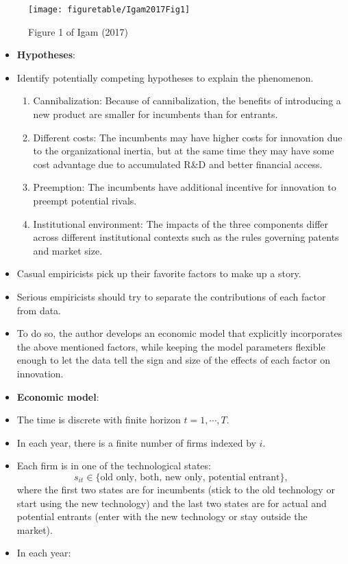 \documentclass[
]{book}
\providecommand{\tightlist}{%
  \setlength{\itemsep}{0pt}\setlength{\parskip}{0pt}}
\begin{document}
\begin{figure}

{\centering \texttt{[image: figuretable/Igam2017Fig1]} 

}

\caption{Figure 1 of Igam (2017)}\label{fig:unnamed-chunk-2}
\end{figure}

\begin{itemize}
\item
  \textbf{Hypotheses}:
\item
  Identify potentially competing hypotheses to explain the phenomenon.

  \begin{enumerate}
  \def\labelenumi{\arabic{enumi}.}
  \tightlist
  \item
    Cannibalization: Because of cannibalization, the benefits of introducing a new product are smaller for incumbents than for entrants.
  \item
    Different costs: The incumbents may have higher costs for innovation due to the organizational inertia, but at the same time they may have some cost advantage due to accumulated R\&D and better financial access.
  \item
    Preemption: The incumbents have additional incentive for innovation to preempt potential rivals.
  \item
    Institutional environment: The impacts of the three components differ across different institutional contexts such as the rules governing patents and market size.
  \end{enumerate}
\item
  Casual empiricists pick up their favorite factors to make up a story.
\item
  Serious empiricists should try to separate the contributions of each factor from data.
\item
  To do so, the author develops an economic model that explicitly incorporates the above mentioned factors, while keeping the model parameters flexible enough to let the data tell the sign and size of the effects of each factor on innovation.
\item
  \textbf{Economic model}:
\item
  The time is discrete with finite horizon \(t = 1, \cdots, T\).
\item
  In each year, there is a finite number of firms indexed by \(i\).
\item
  Each firm is in one of the technological states:
  \begin{equation}
  s_{it} \in \{\text{old only, both, new only, potential entrant}\},
  \end{equation}
  where the first two states are for incumbents (stick to the old technology or start using the new technology) and the last two states are for actual and potential entrants (enter with the new technology or stay outside the market).
\item
  In each year:


\end{itemize}
\end{document}
